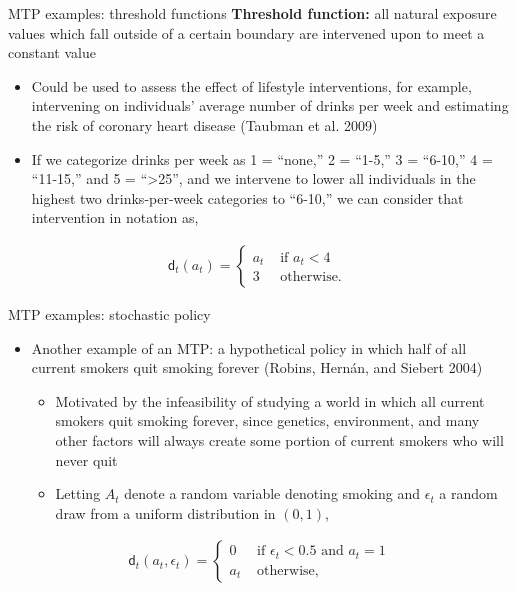 \documentclass[
  10pt,
  ignorenonframetext,
]{beamer}
\begin{document}
\begin{frame}{MTP examples: threshold functions}
\protect\hypertarget{mtp-examples-threshold-functions}{}
\textbf{Threshold function:} all natural exposure values which fall
outside of a certain boundary are intervened upon to meet a constant
value

\begin{itemize}
\item
  Could be used to assess the effect of lifestyle interventions, for
  example, intervening on individuals' average number of drinks per week
  and estimating the risk of coronary heart disease (Taubman et al.
  2009)
\item
  If we categorize drinks per week as 1 = ``none,'' 2 = ``1-5,'' 3 =
  ``6-10,'' 4 = ``11-15,'' and 5 = ``\textgreater25'', and we intervene
  to lower all individuals in the highest two drinks-per-week categories
  to ``6-10,'' we can consider that intervention in notation as,
\end{itemize}

\begin{align*}
\mathsf{d}_t(a_t)=\begin{cases}
      a_t & \text{ if } a_t < 4\\
      3 & \text{ otherwise. }
    \end{cases}
\end{align*}
\end{frame}

\begin{frame}{MTP examples: stochastic policy}
\protect\hypertarget{mtp-examples-stochastic-policy}{}
\begin{itemize}
\item
  Another example of an MTP: a hypothetical policy in which half of all
  current smokers quit smoking forever (Robins, Hernán, and Siebert
  2004)

  \begin{itemize}
  \item
    Motivated by the infeasibility of studying a world in which all
    current smokers quit smoking forever, since genetics, environment,
    and many other factors will always create some portion of current
    smokers who will never quit
  \item
    Letting \(A_t\) denote a random variable denoting smoking and
    \(\epsilon_t\) a random draw from a uniform distribution in
    \((0,1)\),
  \end{itemize}
\end{itemize}

\begin{align*}
\mathsf{d}_t(a_t,\epsilon_t)=\begin{cases}
      0 & \text{ if } \epsilon_t<0.5 \text{ and } a_t=1\\
      a_t & \text{ otherwise, }
    \end{cases}
\end{align*}
\end{frame}
\end{document}
